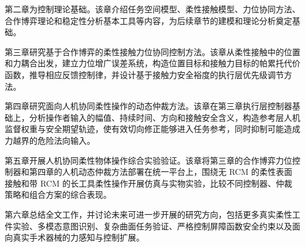 第二章为控制理论基础。该章介绍任务空间模型、柔性接触模型、力位协同方法、合作博弈理论和稳定性分析基本工具等内容，为后续章节的建模和理论分析奠定基础。

第三章研究基于合作博弈的柔性接触力位协同控制方法。该章从柔性接触中的位置和力耦合出发，建立力位增广误差系统，构造位置目标和接触力目标的帕累托代价函数，推导相应反馈控制律，并设计基于接触力安全裕度的执行层优先级调节方法。

第四章研究面向人机协同柔性操作的动态仲裁方法。该章在第三章执行层控制器基础上，分析操作者输入的幅值、持续时间、方向和接触安全含义，构造参考层人机监督权重与安全期望轨迹，使有效切向修正能够进入任务参考，同时抑制可能造成力越界的危险法向输入。

第五章开展人机协同柔性物体操作综合实验验证。该章将第三章的合作博弈力位控制器和第四章的人机动态仲裁方法部署在统一平台上，围绕无 RCM 的柔性表面接触和带 RCM 的长工具柔性操作开展仿真与实物实验，比较不同控制器、仲裁策略和组合方案的综合表现。

第六章总结全文工作，并讨论未来可进一步开展的研究方向，包括更多真实柔性工件实验、多模态意图识别、复杂曲面任务验证、严格控制屏障函数安全约束以及面向真实手术器械的力感知与控制扩展。
